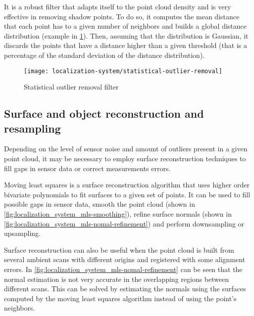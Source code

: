 It is a robust filter that adapts itself to the point cloud density and is very effective in removing shadow points. To do so, it computes the mean distance that each point has to a given number of neighbors and builds a global distance distribution (example in \cref{fig:localization_system_statistical-outlier-removal}). Then, assuming that the distribution is Gaussian, it discards the points that have a distance higher than a given threshold (that is a percentage of the standard deviation of the distance distribution).

\begin{figure}[H]
	\centering
	\texttt{[image: localization-system/statistical-outlier-removal]}
	\caption[Statistical outlier removal filter]{Statistical outlier removal filter\protect\footnotemark}
	\label{fig:localization_system_statistical-outlier-removal}
\end{figure}


\subsection{Surface and object reconstruction and resampling}\label{subsec:localization_system_surface-reconstruction-resampling}

Depending on the level of sensor noise and amount of outliers present in a given point cloud, it may be necessary to employ surface reconstruction techniques to fill gaps in sensor data or correct measurements errors.

Moving least squares \cite{Alexa2003} is a surface reconstruction algorithm that uses higher order bivariate polynomials to fit surfaces to a given set of points. It can be used to fill possible gaps in sensor data, smooth the point cloud (shown in \cref{fig:localization_system_mls-smoothing}), refine surface normals (shown in \cref{fig:localization_system_mls-nomal-refinement}) and perform downsampling or upsampling.

Surface reconstruction can also be useful when the point cloud is built from several ambient scans with different origins and registered with some alignment errors. In \cref{fig:localization_system_mls-nomal-refinement} can be seen that the normal estimation is not very accurate in the overlapping regions between different scans. This can be solved by estimating the normals using the surfaces computed by the moving least squares algorithm instead of using the point's neighbors.


